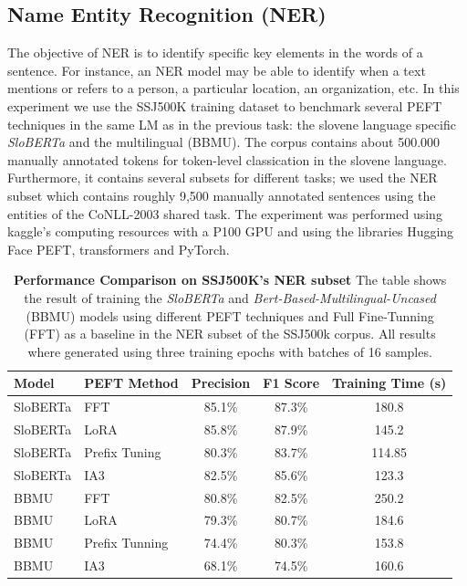 \documentclass[fleqn,moreauthors,10pt]{ds_report}
\begin{document}
\subsection{Name Entity Recognition (NER)}
The objective of NER is to identify specific key elements in the words of a sentence. For instance, an NER model may be able to identify when a text mentions or refers to a person, a particular location, an organization, etc. In this experiment we use the SSJ500K training dataset to benchmark several PEFT techniques in the same LM as in the previous task: the slovene language specific \textit{SloBERTa} and the multilingual  (BBMU). The corpus contains about 500.000 manually annotated tokens for token-level classication in the slovene language. Furthermore, it contains several subsets for different tasks; we used the NER subset which contains roughly 9,500 manually annotated sentences using the entities of the CoNLL-2003 shared task. The experiment was performed using kaggle's computing resources with a P100 GPU and using the libraries Hugging Face PEFT, transformers and PyTorch.

\begin{table}[ht]
\centering
\caption{\textbf{Performance Comparison on SSJ500K's NER subset} The table shows the result of training the {\it SloBERTa} and {\it Bert-Based-Multilingual-Uncased} (BBMU) models using different PEFT techniques and Full Fine-Tunning (FFT) as a baseline in the NER subset of the SSJ500k corpus. All results where generated using three training epochs with batches of 16 samples.}
\label{tab:ner_results}
\small
\begin{tabular}{@{}llccc@{}}
\toprule
Model & PEFT Method & Precision & F1 Score & Training Time (s)\\ \midrule
SloBERTa & FFT & 85.1\% & 87.3\% & 180.8 \\
SloBERTa & LoRA & 85.8\% & 87.9\% & 145.2 \\
SloBERTa & Prefix Tuning & 80.3\% & 83.7\% & 114.85 \\
SloBERTa & IA3 & 82.5\% & 85.6\% & 123.3 \\
BBMU & FFT & 80.8\% & 82.5\% & 250.2 \\
BBMU & LoRA & 79.3\% & 80.7\% & 184.6 \\
BBMU & Prefix Tunning & 74.4\% & 80.3\% & 153.8 \\
BBMU & IA3 & 68.1\% & 74.5\% & 160.6 \\
\bottomrule
\end{tabular}
\end{table}
\end{document}
